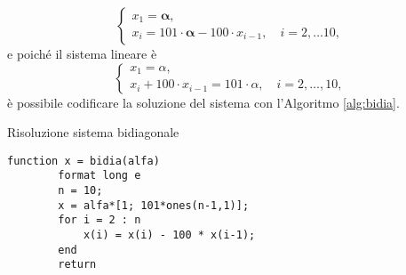 \begin{equation*}
    \begin{cases}
        x_1 = \boldsymbol\alpha,\\
        x_i = 101\cdot\boldsymbol\alpha - 100\cdot x_{i-1},\quad i=2,\hdots10,
    \end{cases}
\end{equation*}
e poiché il sistema lineare è
\begin{equation*}
    \begin{cases}
        x_1=\alpha,\\
        x_i+100\cdot x_{i-1} = 101\cdot \alpha,\quad i=2,\hdots,10,
    \end{cases}
\end{equation*}
è possibile codificare la soluzione del sistema con l'Algoritmo \ref{alg:bidia}.

\begin{algorithm}
\caption{Risoluzione sistema bidiagonale}
\label{alg:bidia}
    \begin{lstlisting}[style=Matlab-editor]
        function x = bidia(alfa)
        format long e
        n = 10;
        x = alfa*[1; 101*ones(n-1,1)];
        for i = 2 : n
            x(i) = x(i) - 100 * x(i-1);
        end
        return
    \end{lstlisting}
\end{algorithm}

